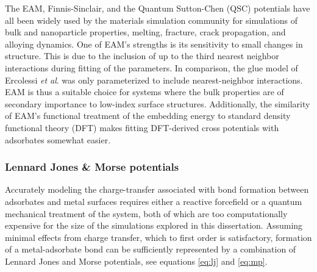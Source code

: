 
The EAM, Finnis-Sinclair, and the Quantum Sutton-Chen (QSC) potentials
have all been widely used by the materials simulation community for
simulations of bulk and nanoparticle
properties,\citep{Chui:2003fk, Wang:2005qy, Medasani:2007uq, Mishin:1999ew}
melting,\citep{Belonoshko:2000jk, Sankaranarayanan:2006ye, Sankaranarayanan:2005bh}
fracture,\citep{Shastry:1996qg, Shastry:1998dx, Mishin:2001qt} crack
propagation,\citep{Becquart:1993sr, Rifkin:1992ug} and alloying
dynamics.\citep{Shibata:2002hh, Mishin:2002if, Zope:2003ai, Mishin:2005vc}
One of EAM's strengths is its sensitivity to small changes in
structure. This is due to the inclusion of up to the third nearest
neighbor interactions during fitting of the parameters.\citep{Voter:1995ax}
In comparison, the glue model of Ercolessi {\it et
  al}.\citep{Ercolessi:1988uo} was only parameterized to include
nearest-neighbor interactions. EAM is thus a suitable choice for systems
where the bulk properties are of secondary importance to low-index
surface structures. Additionally, the similarity of EAM's functional
treatment of the embedding energy to standard density functional
theory (DFT) makes fitting DFT-derived cross potentials with
adsorbates somewhat easier.

\subsubsection{Lennard Jones \& Morse potentials}
Accurately modeling the charge-transfer associated with bond formation between
adsorbates and metal surfaces requires either a reactive forcefield or a
quantum mechanical treatment of the system, both of which are too computationally expensive
for the size of the simulations explored in this dissertation. Assuming minimal effects
from charge transfer, which to first order is satisfactory, formation
of a metal-adsorbate bond can be sufficiently represented by a combination of
Lennard Jones and Morse potentials, see equations \ref{eq:lj} and \ref{eq:mp}.

